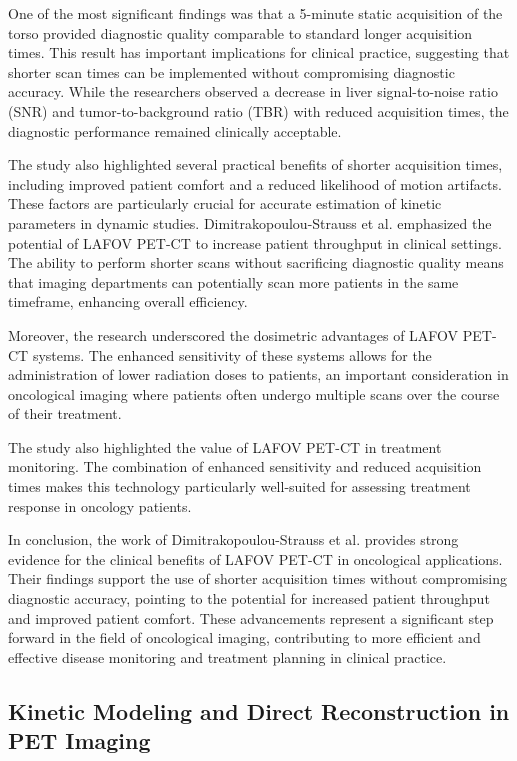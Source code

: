 One of the most significant findings was that a 5-minute static acquisition of the torso provided diagnostic quality comparable to standard longer acquisition times. This result has important implications for clinical practice, suggesting that shorter scan times can be implemented without compromising diagnostic accuracy. While the researchers observed a decrease in liver signal-to-noise ratio (SNR) and tumor-to-background ratio (TBR) with reduced acquisition times, the diagnostic performance remained clinically acceptable.

The study also highlighted several practical benefits of shorter acquisition times, including improved patient comfort and a reduced likelihood of motion artifacts. These factors are particularly crucial for accurate estimation of kinetic parameters in dynamic studies.
Dimitrakopoulou-Strauss et al. emphasized the potential of LAFOV PET-CT to increase patient throughput in clinical settings. The ability to perform shorter scans without sacrificing diagnostic quality means that imaging departments can potentially scan more patients in the same timeframe, enhancing overall efficiency.

Moreover, the research underscored the dosimetric advantages of LAFOV PET-CT systems. The enhanced sensitivity of these systems allows for the administration of lower radiation doses to patients, an important consideration in oncological imaging where patients often undergo multiple scans over the course of their treatment.

The study also highlighted the value of LAFOV PET-CT in treatment monitoring. The combination of enhanced sensitivity and reduced acquisition times makes this technology particularly well-suited for assessing treatment response in oncology patients.

In conclusion, the work of Dimitrakopoulou-Strauss et al. provides strong evidence for the clinical benefits of LAFOV PET-CT in oncological applications. Their findings support the use of shorter acquisition times without compromising diagnostic accuracy, pointing to the potential for increased patient throughput and improved patient comfort. These advancements represent a significant step forward in the field of oncological imaging, contributing to more efficient and effective disease monitoring and treatment planning in clinical practice.

\subsection{Kinetic Modeling and Direct Reconstruction in PET Imaging}

